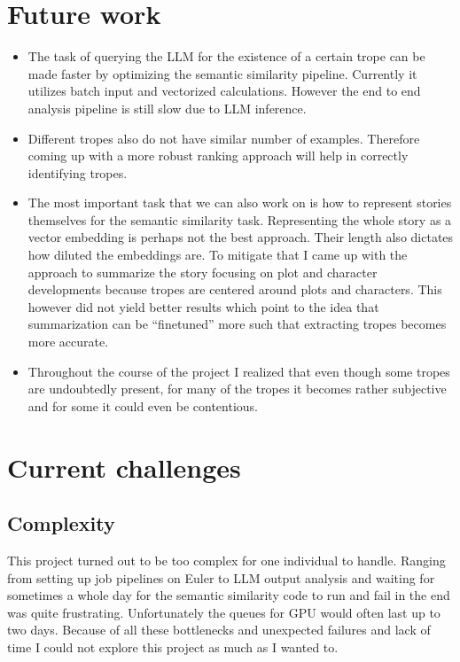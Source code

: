 \documentclass[11pt]{article}
\begin{document}
\section{Future work}
\begin{itemize}
  \item The task of querying the LLM for the existence of a certain trope can be made faster by optimizing the semantic similarity pipeline. Currently it utilizes batch input and vectorized calculations. However the end to end analysis pipeline is still slow due to LLM inference.
  \item Different tropes also do not have similar number of examples. Therefore coming up with a more robust ranking approach will help in correctly identifying tropes.
  \item The most important task that we can also work on is how to represent stories themselves for the semantic similarity task. Representing the whole story as a vector embedding is perhaps not the best approach. Their length also dictates how diluted the embeddings are. To mitigate that I came up with the approach to summarize the story focusing on plot and character developments because tropes are centered around plots and characters. This however did not yield better results which point to the idea that summarization can be ``finetuned'' more such that extracting tropes becomes more accurate.
  \item Throughout the course of the project I realized that even though some tropes are undoubtedly present, for many of the tropes it becomes rather subjective and for some it could even be contentious.
\end{itemize}

\section{Current challenges}
\subsection{Complexity}
This project turned out to be too complex for one individual to handle. Ranging from setting up job pipelines on Euler to LLM output analysis and waiting for sometimes a whole day for the semantic similarity code to run and fail in the end was quite frustrating. Unfortunately the queues for GPU would often last up to two days. Because of all these bottlenecks and unexpected failures and lack of time I could not explore this project as much as I wanted to.
\end{document}
